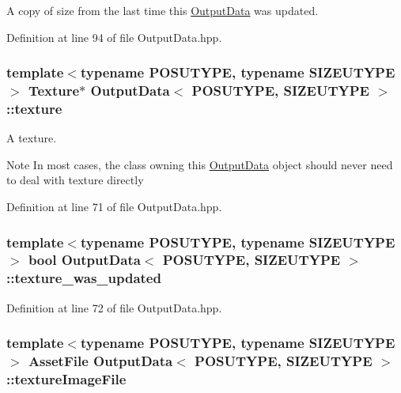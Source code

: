 A copy of size from the last time this \hyperlink{struct_output_data}{Output\-Data} was updated. 



Definition at line 94 of file Output\-Data.\-hpp.

\hypertarget{struct_output_data_af592125b9117db60d387049a7631c763}{
\subsubsection[{texture}]{\setlength{\rightskip}{0pt plus 5cm}template$<$typename P\-O\-S\-U\-T\-Y\-P\-E, typename S\-I\-Z\-E\-U\-T\-Y\-P\-E$>$ {\bf Texture}$\ast$ {\bf Output\-Data}$<$ P\-O\-S\-U\-T\-Y\-P\-E, S\-I\-Z\-E\-U\-T\-Y\-P\-E $>$\-::texture\hspace{0.3cm}{\ttfamily [protected]}}}\label{struct_output_data_af592125b9117db60d387049a7631c763}


A texture. 

\begin{DoxyNote}{Note}
In most cases, the class owning this \hyperlink{struct_output_data}{Output\-Data} object should never need to deal with texture directly 
\end{DoxyNote}


Definition at line 71 of file Output\-Data.\-hpp.

\hypertarget{struct_output_data_aa35a2457b23d1a6843ec49c2f6a4b29a}{
\subsubsection[{texture\-\_\-was\-\_\-updated}]{\setlength{\rightskip}{0pt plus 5cm}template$<$typename P\-O\-S\-U\-T\-Y\-P\-E, typename S\-I\-Z\-E\-U\-T\-Y\-P\-E$>$ bool {\bf Output\-Data}$<$ P\-O\-S\-U\-T\-Y\-P\-E, S\-I\-Z\-E\-U\-T\-Y\-P\-E $>$\-::texture\-\_\-was\-\_\-updated\hspace{0.3cm}{\ttfamily [protected]}}}\label{struct_output_data_aa35a2457b23d1a6843ec49c2f6a4b29a}


Definition at line 72 of file Output\-Data.\-hpp.

\hypertarget{struct_output_data_aada926eef9e2b2b654caa32de712ef1b}{
\subsubsection[{texture\-Image\-File}]{\setlength{\rightskip}{0pt plus 5cm}template$<$typename P\-O\-S\-U\-T\-Y\-P\-E, typename S\-I\-Z\-E\-U\-T\-Y\-P\-E$>$ {\bf Asset\-File} {\bf Output\-Data}$<$ P\-O\-S\-U\-T\-Y\-P\-E, S\-I\-Z\-E\-U\-T\-Y\-P\-E $>$\-::texture\-Image\-File\hspace{0.3cm}{\ttfamily [protected]}}}\label{struct_output_data_aada926eef9e2b2b654caa32de712ef1b}


